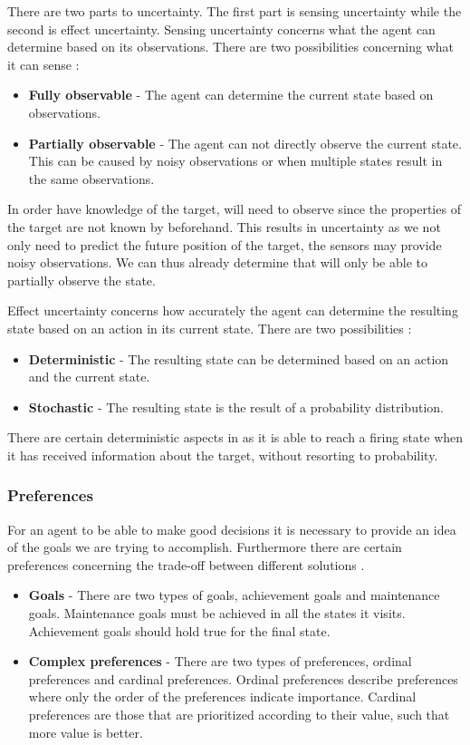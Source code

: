 There are two parts to uncertainty. The first part is sensing uncertainty while
the second is effect uncertainty. Sensing uncertainty concerns what the agent
can determine based on its observations. There are two possibilities concerning
what it can sense \citep[Ch. 1.5.4]{MIBook}:
\begin{itemize}
  \item \textbf{Fully observable} - The agent can determine the current state
  based on observations.
  \item \textbf{Partially observable} - The agent can not directly observe the
  current state. This can be caused by noisy observations or when multiple
  states result in the same observations.
\end{itemize}

In order have knowledge of the target, \name will need to observe since the
properties of the target are not known by \name beforehand. This results in
uncertainty as we not only need to predict the future position of the target,
the sensors may provide noisy observations. We can thus already determine that
\name will only be able to partially observe the state.\nl

Effect uncertainty concerns how accurately the agent can determine the resulting
state based on an action in its current state. There are two possibilities
\citep[Ch. 1.5.4]{MIBook}:
\begin{itemize}
  \item \textbf{Deterministic} - The resulting state can be determined based on
  an action and the current state.
  \item \textbf{Stochastic} - The resulting state is the result of a probability
  distribution.
\end{itemize}

There are certain deterministic aspects in \name as it is able to reach a
firing state when it has received information about the target, without
resorting to probability.
 
\subsubsection{Preferences}
For an agent to be able to make good decisions it is necessary to provide an
idea of the goals we are trying to accomplish. Furthermore there are certain
preferences concerning the trade-off between different solutions \citep[Ch.
1.5.5]{MIBook}.

\begin{itemize}
  \item \textbf{Goals} - There are two types of goals, achievement goals and
  maintenance goals. Maintenance goals must be achieved in all the states it
  visits. Achievement goals should hold true for the final state. 
  \item \textbf{Complex preferences} - There are two types of preferences,
  ordinal preferences and cardinal preferences. Ordinal preferences describe
  preferences where only the order of the preferences indicate importance.
  Cardinal preferences are those that are prioritized according to their value,
  such that more value is better.
\end{itemize}

